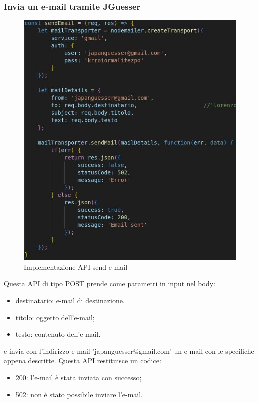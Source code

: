 \subsubsection{Invia un e-mail tramite JGuesser}
\begin{figure}[!h]
\centering
\includegraphics[scale=0.4]{images/api_send_email.jpg}
\caption{Implementazione API send e-mail}
\label{fig:api_send_email}
\end{figure}
\noindent
Questa API di tipo POST prende come parametri in input nel body:
\begin{itemize}
    \item destinatario: e-mail di destinazione.
    \item titolo: oggetto dell'e-mail;
    \item testo: contenuto dell'e-mail.
\end{itemize}
e invia con l'indirizzo e-mail 'japanguesser@gmail.com' un e-mail con le specifiche appena descritte.
Questa API restituisce un codice:
\begin{itemize}
    \item 200: l'e-mail è stata inviata con successo;
    \item 502: non è stato possibile inviare l'e-mail.
\end{itemize}

